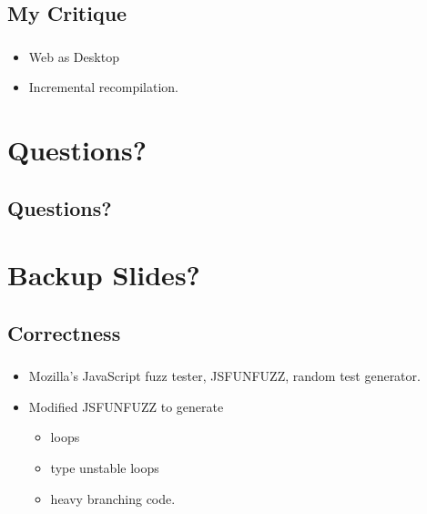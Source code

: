 \documentclass[mathserif,10pt]{beamer}
\newcommand{\cmt}[1]{}
\begin{document}
\subsection{My Critique}
\frame
{
  \frametitle{\subsecname}
  \begin{itemize}
    \item Web as Desktop
      \cmt{In short, plenty. JavaScript has become a predominant technology amongst today's web developers, and Mozilla—along with pretty much every web browser maker out there—aims to make it just as fast as code that runs on your desktop. The closer everyone gets to that kind of speed, the closer the idea of the Web as Desktop gets to reality. This is handily demonstrated in a video demonstration of online photo editing over at Mozilla's site. With just-in-time compiling, actions the user takes on a web program move along as if being adjusted in a desktop app, as opposed to having to basically re-load an entire JavaScript app and figure out what state it's in.}
    \item Incremental recompilation.
  \end{itemize}
}

\section{Questions?}
\subsection{Questions?}
\frame
{}

\section{Backup Slides?}
\subsection{Correctness}
\frame
{
  \frametitle{\subsecname}
  \begin{itemize}
    \item Mozilla’s JavaScript fuzz tester, JSFUNFUZZ, random test generator.
    \item Modified JSFUNFUZZ to generate
    \begin{itemize}
      \item loops
      \item type unstable loops
      \item heavy branching code.
    \end{itemize}
  \end{itemize}
}
\end{document}
